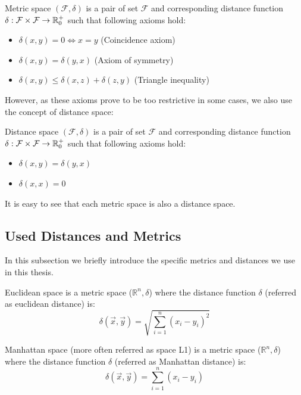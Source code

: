 \begin{defn}
Metric space $(\mathcal{F}, \delta)$ is a pair of set $\mathcal{F}$ and
corresponding distance function
$\delta : \mathcal{F} \times \mathcal{F} \rightarrow \mathbb{R}_0^+$ such that
following axioms hold:
\begin{itemize}
    \item $\delta(x, y) = 0 \Leftrightarrow x = y$ (Coincidence axiom)
    \item $\delta(x, y) = \delta(y, x)$ (Axiom of symmetry)
    \item $\delta(x, y) \leq \delta(x, z) + \delta(z, y)$ (Triangle inequality)
\end{itemize}
\end{defn}%

However, as these axioms prove to be too restrictive in some cases, we also
use the concept of distance space:
\begin{defn}
Distance space $(\mathcal{F}, \delta)$ is a pair of set $\mathcal{F}$ and
corresponding distance function $\delta : \mathcal{F} \times \mathcal{F} \rightarrow \mathbb{R}_0^+$ such that
following axioms hold:
\begin{itemize}
    \item $\delta(x, y) = \delta(y, x)$
    \item $\delta(x, x) = 0$
\end{itemize}
\end{defn}%
It is easy to see that each metric space is also a distance space.

\subsection{Used Distances and Metrics}

\label{ssec:used_distances}

In this subsection we briefly introduce the specific metrics and distances
we use in this thesis.

\begin{defn}
Euclidean space is a metric space ($\mathbb{R}^n, \delta$) where the
distance function $\delta$ (referred as euclidean distance) is:
$$\delta(\vec{x}, \vec{y}) = \sqrt{\sum_{i=1}^n(x_i - y_i)^2}$$
\end{defn}

\begin{defn}
Manhattan space (more often referred as space L1) is a metric
space ($\mathbb{R}^n, \delta$) where the
distance function $\delta$ (referred as Manhattan distance) is:
$$\delta(\vec{x}, \vec{y}) = \sum_{i=1}^n(x_i - y_i)$$
\end{defn}

